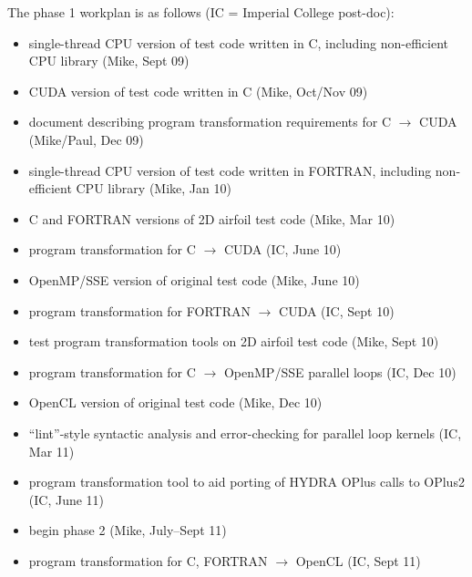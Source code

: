 \documentclass[12pt]{article}
\begin{document}
The phase 1 workplan is as follows (IC = Imperial College post-doc):
\begin{itemize}
\item
single-thread CPU version of test code written in C,
including non-efficient CPU library (Mike, Sept 09)

\item
CUDA version of test code written in C (Mike, Oct/Nov 09)

\item
document describing program transformation requirements for 
C $\rightarrow$ CUDA (Mike/Paul, Dec 09)

\item
single-thread CPU version of test code written in FORTRAN,
including non-efficient CPU library (Mike, Jan 10)

\item
C and FORTRAN versions of 2D airfoil test code (Mike, Mar 10)

\item
program transformation for C $\rightarrow$ CUDA (IC, June 10)

\item
OpenMP/SSE version of original test code (Mike, June 10)

\item
program transformation for FORTRAN $\rightarrow$ CUDA 
(IC, Sept 10)

\item
test program transformation tools on 2D airfoil test code 
(Mike, Sept 10)

\item
program transformation for C $\rightarrow$ OpenMP/SSE parallel 
loops (IC, Dec 10)

\item
OpenCL version of original test code (Mike, Dec 10)

\item
``lint''-style syntactic analysis and error-checking for 
parallel loop kernels (IC, Mar 11)

\item
program transformation tool to aid porting of HYDRA OPlus
calls to OPlus2 (IC, June 11)

\item
begin phase 2 (Mike, July--Sept 11)

\item
program transformation for C, FORTRAN $\rightarrow$ OpenCL 
(IC, Sept 11)
\end{itemize}
\end{document}

